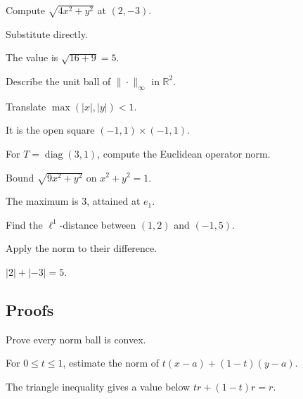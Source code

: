 \begin{exercise}\label{exr:ii02-expand-02}
Compute \(\sqrt{4x^2+y^2}\) at \((2,-3)\).
\end{exercise}
\begin{hint}
Substitute directly.
\end{hint}
\begin{solution}
The value is \(\sqrt{16+9}=5\).
\end{solution}

\begin{exercise}\label{exr:ii02-expand-03}
Describe the unit ball of \(\|\cdot\|_\infty\) in \(\mathbb R^2\).
\end{exercise}
\begin{hint}
Translate \(\max(|x|,|y|)<1\).
\end{hint}
\begin{solution}
It is the open square \((-1,1)\times(-1,1)\).
\end{solution}

\begin{exercise}\label{exr:ii02-expand-04}
For \(T=\operatorname{diag}(3,1)\), compute the Euclidean operator norm.
\end{exercise}
\begin{hint}
Bound \(\sqrt{9x^2+y^2}\) on \(x^2+y^2=1\).
\end{hint}
\begin{solution}
The maximum is \(3\), attained at \(e_1\).
\end{solution}

\begin{exercise}[Distance]\label{exr:ii02-expand-05}
Find the \(\ell^1\)-distance between \((1,2)\) and \((-1,5)\).
\end{exercise}
\begin{hint}
Apply the norm to their difference.
\end{hint}
\begin{solution}
\(|2|+|-3|=5\).
\end{solution}

\subsection*{Proofs}

\begin{exercise}\label{exr:ii02-expand-06}
Prove every norm ball is convex.
\end{exercise}
\begin{hint}
For \(0\le t\le1\), estimate the norm of \(t(x-a)+(1-t)(y-a)\).
\end{hint}
\begin{solution}
The triangle inequality gives a value below \(tr+(1-t)r=r\).
\end{solution}

